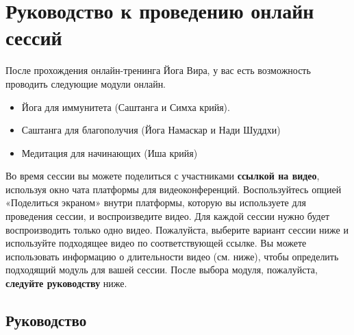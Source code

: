 \newpage
\section*{Руководство к проведению онлайн сессий}
\label{sec:online}

После прохождения онлайн-тренинга Йога Вира, у вас есть возможность проводить следующие модули онлайн.
\begin{itemize}
\item Йога для иммунитета (Саштанга и Симха крийя).
\item Саштанга для благополучия (Йога Намаскар и Нади Шуддхи)
\item Медитация для начинающих (Иша крийя)
\end{itemize}
Во время сессии вы можете поделиться с участниками \textbf{ссылкой на видео}, используя окно чата платформы для видеоконференций. Воспользуйтесь опцией
«Поделиться экраном» внутри платформы, которую вы используете для
проведения сессии, и воспроизведите видео.
Для каждой сессии нужно будет воспроизводить только одно видео.
Пожалуйста, выберите вариант сессии ниже и используйте подходящее видео по соответствующей ссылке. Вы можете использовать информацию о длительности видео (см. ниже), чтобы определить подходящий модуль для вашей сессии.
После выбора модуля, пожалуйста, \textbf{следуйте руководству} ниже.

\subsection*{Руководство}
\label{sec:list}

